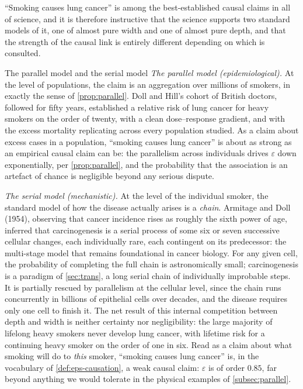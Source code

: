 \documentclass[11pt]{article}
\theoremstyle{definition}
\newcommand{\eps}{\varepsilon}
\begin{document}
``Smoking causes lung cancer'' is among the best-established causal claims in all of science, and it is therefore instructive that the science supports two standard models of it, one of almost pure width and one of almost pure depth, and that the strength of the causal link is entirely different depending on which is consulted.

\begin{techbox}{The parallel model and the serial model}
\emph{The parallel model (epidemiological).} At the level of populations, the claim is an aggregation over millions of smokers, in exactly the sense of \cref{prop:parallel}. Doll and Hill's cohort of British doctors, followed for fifty years, established a relative risk of lung cancer for heavy smokers on the order of twenty, with a clean dose--response gradient, and with the excess mortality replicating across every population studied. As a claim about excess cases in a population, ``smoking causes lung cancer'' is about as strong as an empirical causal claim can be: the parallelism across individuals drives $\eps$ down exponentially, per \cref{prop:parallel}, and the probability that the association is an artefact of chance is negligible beyond any serious dispute.

\emph{The serial model (mechanistic).} At the level of the individual smoker, the standard model of how the disease actually arises is a \emph{chain}. Armitage and Doll (1954), observing that cancer incidence rises as roughly the sixth power of age, inferred that carcinogenesis is a serial process of some six or seven successive cellular changes, each individually rare, each contingent on its predecessor: the multi-stage model that remains foundational in cancer biology. For any given cell, the probability of completing the full chain is astronomically small; carcinogenesis is a paradigm of \cref{sec:trans}, a long serial chain of individually improbable steps. It is partially rescued by parallelism at the cellular level, since the chain runs concurrently in billions of epithelial cells over decades, and the disease requires only one cell to finish it. The net result of this internal competition between depth and width is neither certainty nor negligibility: the large majority of lifelong heavy smokers never develop lung cancer, with lifetime risk for a continuing heavy smoker on the order of one in six. Read as a claim about what smoking will do to \emph{this} smoker, ``smoking causes lung cancer'' is, in the vocabulary of \cref{def:eps-causation}, a weak causal claim: $\eps$ is of order $0.85$, far beyond anything we would tolerate in the physical examples of \cref{subsec:parallel}.
\end{techbox}
\end{document}
